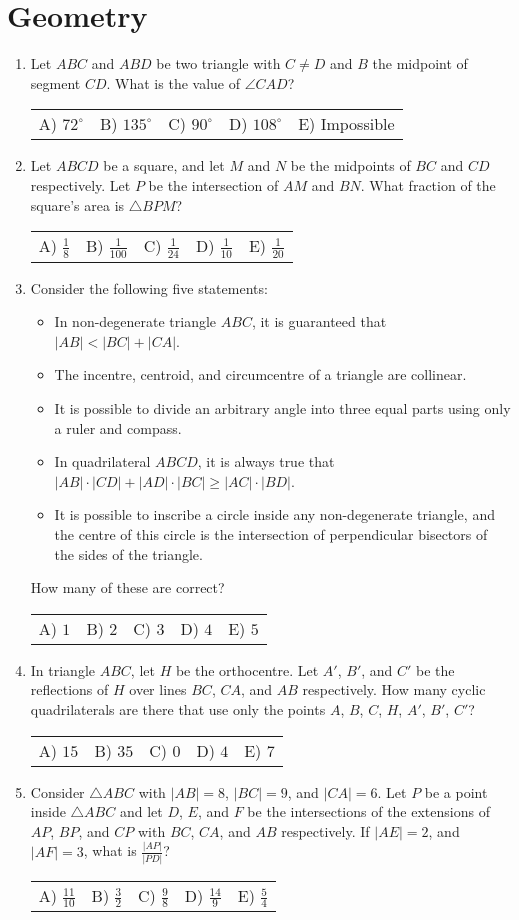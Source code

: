 \documentclass{article}
\newcommand{\answers}[5]{
  \begin{center}
    \begin{tabular}{*{5}{p{0.15\textwidth}}}
      A) #1 & B) #2 & C) #3 & D) #4 & E) #5
    \end{tabular}
  \end{center}
}
\begin{document}
\section{Geometry}
\begin{enumerate}

\item %
Let $ABC$ and $ABD$ be two  triangle with $C \ne D$ and $B$ the midpoint of segment $CD$.
What is the value of $\angle CAD$?
\answers{$72^\circ$}{$135^\circ$}{$90^\circ$}{$108^\circ$}{Impossible}

\item %
Let $ABCD$ be a square, and let $M$ and $N$ be the midpoints of $BC$ and $CD$ respectively.
Let $P$ be the intersection of $AM$ and $BN$.
What fraction of the square's area is $\triangle BPM$?
\answers{ $\frac{1}{8}$ }{ $\frac{1}{100}$ }{ $\frac{1}{24}$ }{ $\frac{1}{10}$ }{ $\frac{1}{20}$ }

\item %
Consider the following five statements:
\begin{itemize}
  \item In non-degenerate triangle $ABC$, it is guaranteed that $|AB| < |BC| + |CA|$.
  \item The incentre, centroid, and circumcentre of a triangle are collinear.
  \item It is possible to divide an arbitrary angle into three equal parts using only a ruler and compass.
  \item In quadrilateral $ABCD$, it is always true that $|AB| \cdot |CD| + |AD| \cdot |BC| \ge |AC| \cdot |BD|$.
  \item It is possible to inscribe a circle inside any non-degenerate triangle, and the centre of this circle is the intersection of perpendicular bisectors of the sides of the triangle.
\end{itemize}
How many of these are correct?
\answers{$1$}{$2$}{$3$}{$4$}{$5$}

\item %
In triangle $ABC$, let $H$ be the orthocentre.
Let $A'$, $B'$, and $C'$ be the reflections of $H$ over lines $BC$, $CA$, and $AB$ respectively.
How many cyclic quadrilaterals are there that use only the points $A$, $B$, $C$, $H$, $A'$, $B'$, $C'$?
\answers{$15$}{$35$}{$0$}{$4$}{$7$}

\item %
Consider $\triangle ABC$ with $|AB| = 8$, $|BC| = 9$, and $|CA| = 6$.
Let $P$ be a point inside $\triangle ABC$ and let $D$, $E$, and $F$ be the intersections of the extensions of $AP$, $BP$, and $CP$ with $BC$, $CA$, and $AB$ respectively.
If $|AE| = 2$, and $|AF| = 3$, what is $\frac{|AP|}{|PD|}$?
\answers{ $\frac{11}{10}$ }{ $\frac{3}{2}$ }{ $\frac{9}{8}$ }{ $\frac{14}{9}$ }{ $\frac{5}{4}$ }

\end{enumerate}
\end{document}
